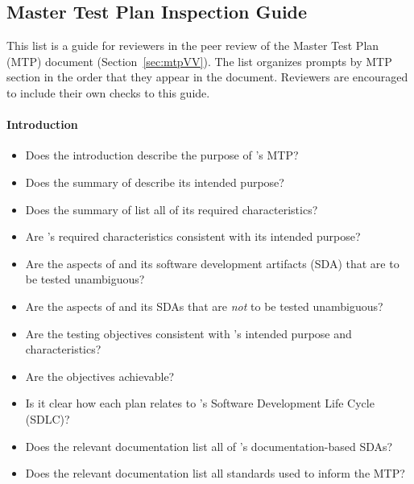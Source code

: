 \subsection{Master Test Plan Inspection Guide}\label{appendix:mtpInspection}
This list is a guide for reviewers in the peer review of the Master Test Plan
(MTP) document (Section~\ref{sec:mtpVV}). The list organizes prompts by MTP
section in the order that they appear in the document. Reviewers are encouraged
to include their own checks to this guide.

\paragraph{Introduction}
\begin{itemize}

    \item Does the introduction describe the purpose of \progname{}'s MTP?

    \item Does the summary of \progname{} describe its intended purpose?

    \item Does the summary of \progname{} list all of its required
    characteristics?

    \item Are \progname{}'s required characteristics consistent with its
    intended purpose?

    \item Are the aspects of \progname{} and its software development artifacts
    (SDA) that are to be tested unambiguous?

    \item Are the aspects of \progname{} and its SDAs that are \textit{not} to
    be tested unambiguous?

    \item Are the testing objectives consistent with \progname{}'s intended
    purpose and characteristics?

    \item Are the objectives achievable?

    \item Is it clear how each plan relates to \progname{}'s Software
    Development Life Cycle (SDLC)?

    \item Does the relevant documentation list all of \progname{}'s
    documentation-based SDAs?

    \item Does the relevant documentation list all standards used to inform the
    MTP?

\end{itemize}

